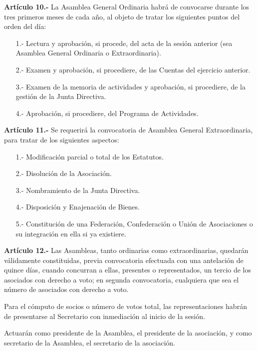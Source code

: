 \documentclass[a4paper,12pt]{article}
\begin{document}
\begin{onehalfspace}
\bigskip\bigskip

\textbf{Artículo 10.-} La Asamblea General Ordinaria habrá de convocarse durante los tres primeros meses de cada año, al objeto de tratar los siguientes puntos del orden del día:
\begin{itemize}
\item [1.-] Lectura y aprobación, si procede, del acta de la sesión anterior (sea Asamblea General Ordinaria o Extraordinaria).
\item [2.-] Examen y aprobación, si procediere, de las Cuentas del ejercicio anterior.
\item [3.-] Examen de la memoria de actividades y aprobación, si procediere, de la gestión de la Junta Directiva.
\item [4.-] Aprobación, si procediere, del Programa de Actividades.
\end{itemize}

\bigskip\bigskip

\textbf{Artículo 11.-} Se requerirá la convocatoria de Asamblea General Extraordinaria, para tratar de los siguientes aspectos:
\begin{itemize}
\item [1.-] Modificación parcial o total de los Estatutos.
\item [2.-] Disolución de la Asociación.
\item [3.-] Nombramiento de la Junta Directiva.
\item [4.-] Disposición y Enajenación de Bienes.
\item [5.-] Constitución de una Federación, Confederación o Unión de Asociaciones o su integración en ella si ya existiere.
\end{itemize}

\bigskip\bigskip

\textbf{Artículo 12.-} Las Asambleas, tanto ordinarias como extraordinarias, quedarán válidamente constituidas, previa convocatoria efectuada con una antelación de quince días, cuando concurran a ellas, presentes o representados, un tercio de los asociados con derecho a voto; en segunda convocatoria, cualquiera que sea el número de asociados con derecho a voto.

Para el cómputo de socios o número de votos total, las representaciones habrán de presentarse al Secretario con inmediación al inicio de la sesión.

Actuarán como presidente de la Asamblea, el presidente de la asociación, y como secretario de la Asamblea, el secretario de la asociación.


\end{onehalfspace}
\end{document}
